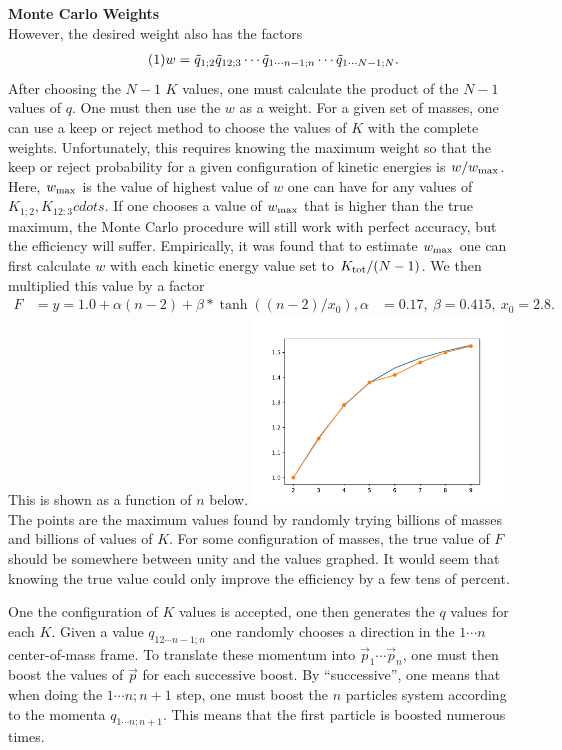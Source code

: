 \documentclass[11pt]{article}
\newcommand\eqnumber{\addtocounter{equation}{1}\tag{\theequation}}
\begin{document}
{\bf Monte Carlo Weights}\\
However, the desired weight also has the factors
\begin{align*}\eqnumber
w=\tilde{q}_{1;2}\tilde{q}_{12;3}\cdots \tilde{q}_{1\cdots n-1;n}\cdots \tilde{q}_{1\cdots N-1;N}.
\end{align*}
After choosing the $N-1$ $K$ values, one must calculate the product of the  $N-1$ values of $q$. One must then use the $w$ as a weight. For a given set of masses, one can use a keep or reject method to choose the values of $K$ with the complete weights. Unfortunately, this requires knowing the maximum weight so that the keep or reject probability for a given configuration of kinetic energies is $w/w_{\rm max}$. Here, $w_{\rm max}$ is the value of highest value of $w$ one can have for any values of $K_{1;2},K_{12:3}cdots$. If one chooses a value of $w_{\rm max}$ that is higher than the true maximum, the Monte Carlo procedure will still work with perfect accuracy, but the efficiency will suffer. Empirically, it was found that to estimate $w_{\rm max}$ one can first calculate $w$ with each kinetic energy value set to $K_{\rm tot}/(N-1)$. We then multiplied this value by a factor
\begin{align*}
F&=y=1.0+\alpha(n-2)+\beta*\tanh((n-2)/x_0),
\alpha&=0.17, ~\beta=0.415, ~x_0=2.8.
\end{align*}
This is shown as a function of $n$ below.
\includegraphics[width=0.5\textwidth]{maxfactor}
The points are the maximum values found by randomly trying billions of masses and billions of values of $K$. For some configuration of masses, the true value of $F$ should be somewhere between unity and the values graphed. It would seem that knowing the true value could only improve the efficiency by a few tens of percent.

One the configuration of $K$ values is accepted, one then generates the $q$ values for each $K$. Given a value $q_{12\cdots n-1;n}$ one randomly chooses a direction in the $1\cdots n$ center-of-mass frame. To translate these momentum into $\vec{p}_1\cdots \vec{p}_n$, one must then boost the values of $\vec{p}$ for each successive boost. By ``successive'', one means that when doing the $1\cdots n;n+1$ step, one must boost the $n$ particles system according to the momenta $q_{1\cdots n;n+1}$. This means that the first particle is boosted numerous times.
\end{document}
